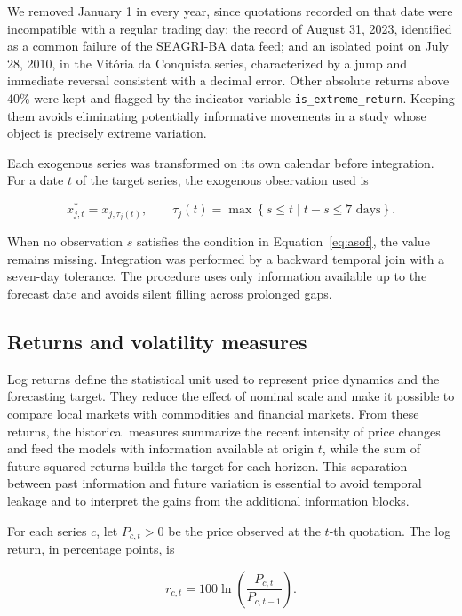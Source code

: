 \documentclass[a4paper,fleqn]{cas-sc}
\begin{document}
We removed January 1 in every year, since quotations recorded on that date were incompatible with a regular trading day; the record of August 31, 2023, identified as a common failure of the SEAGRI-BA data feed; and an isolated point on July 28, 2010, in the Vitória da Conquista series, characterized by a jump and immediate reversal consistent with a decimal error. Other absolute returns above 40\% were kept and flagged by the indicator variable \texttt{is\_extreme\_return}. Keeping them avoids eliminating potentially informative movements in a study whose object is precisely extreme variation.

Each exogenous series was transformed on its own calendar before integration. For a date \(t\) of the target series, the exogenous observation used is

\begin{equation}
x_{j,t}^{*}=x_{j,\tau_j(t)},
\qquad
\tau_j(t)=\max\left\{s\leq t\;|\;t-s\leq 7\text{ days}\right\}.
\label{eq:asof}
\end{equation}

When no observation \(s\) satisfies the condition in Equation~\ref{eq:asof}, the value remains missing. Integration was performed by a backward temporal join with a seven-day tolerance. The procedure uses only information available up to the forecast date and avoids silent filling across prolonged gaps.

\subsection{Returns and volatility measures}
\label{subsec:returns_volatility}

Log returns define the statistical unit used to represent price dynamics and the forecasting target. They reduce the effect of nominal scale and make it possible to compare local markets with commodities and financial markets. From these returns, the historical measures summarize the recent intensity of price changes and feed the models with information available at origin \(t\), while the sum of future squared returns builds the target for each horizon. This separation between past information and future variation is essential to avoid temporal leakage and to interpret the gains from the additional information blocks.

For each series \(c\), let \(P_{c,t}>0\) be the price observed at the \(t\)-th quotation. The log return, in percentage points, is

\begin{equation}
r_{c,t}=100\ln\left(\frac{P_{c,t}}{P_{c,t-1}}\right).
\label{eq:log_return}
\end{equation}
\end{document}
